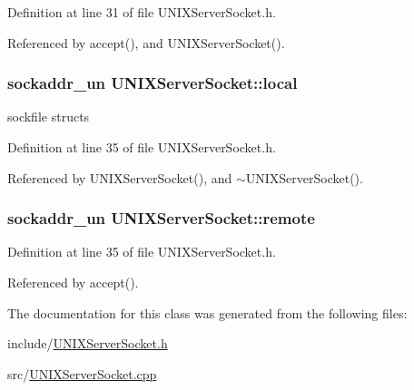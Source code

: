 Definition at line 31 of file U\+N\+I\+X\+Server\+Socket.\+h.



Referenced by accept(), and U\+N\+I\+X\+Server\+Socket().

\hypertarget{classUNIXServerSocket_a8e6873260b9bb0e49ed09a4d03694044}{
\subsubsection[{local}]{\setlength{\rightskip}{0pt plus 5cm}sockaddr\+\_\+un U\+N\+I\+X\+Server\+Socket\+::local\hspace{0.3cm}{\ttfamily [private]}}}\label{classUNIXServerSocket_a8e6873260b9bb0e49ed09a4d03694044}
sockfile structs 

Definition at line 35 of file U\+N\+I\+X\+Server\+Socket.\+h.



Referenced by U\+N\+I\+X\+Server\+Socket(), and $\sim$\+U\+N\+I\+X\+Server\+Socket().

\hypertarget{classUNIXServerSocket_a19d9cd6705ffa42363e04f989b0c4904}{
\subsubsection[{remote}]{\setlength{\rightskip}{0pt plus 5cm}sockaddr\+\_\+un U\+N\+I\+X\+Server\+Socket\+::remote\hspace{0.3cm}{\ttfamily [private]}}}\label{classUNIXServerSocket_a19d9cd6705ffa42363e04f989b0c4904}


Definition at line 35 of file U\+N\+I\+X\+Server\+Socket.\+h.



Referenced by accept().



The documentation for this class was generated from the following files\+:\begin{DoxyCompactItemize}
\item 
include/\hyperlink{UNIXServerSocket_8h}{U\+N\+I\+X\+Server\+Socket.\+h}\item 
src/\hyperlink{UNIXServerSocket_8cpp}{U\+N\+I\+X\+Server\+Socket.\+cpp}\end{DoxyCompactItemize}

